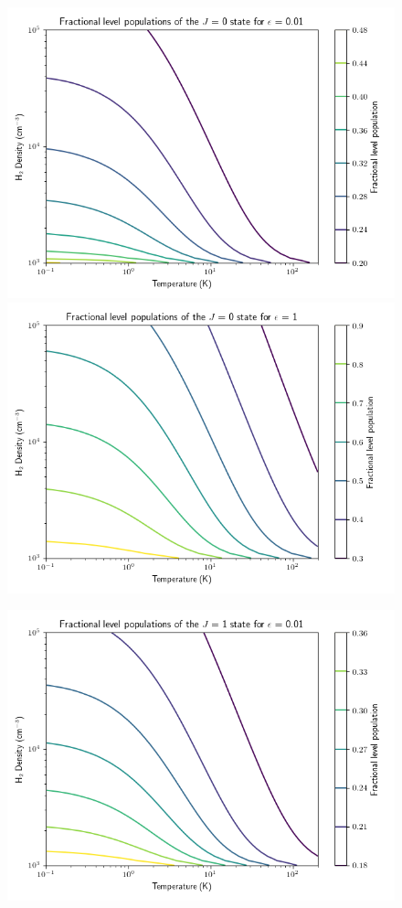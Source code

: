 \documentclass[11pt]{article}
\newenvironment{tight_enumerate}{
\begin{enumerate}[label=(\alph*)]
\setlength{\itemsep}{3pt}
\setlength{\parskip}{0pt}
}{\end{enumerate}}
\begin{document}
\begin{tight_enumerate}
\begin{figure}[H]
\includegraphics[height=0.25\textheight]{1/0_0.png}
\includegraphics[height=0.25\textheight]{1/0_1.png}
\vspace{-2.5em}
\end{figure}
\begin{figure}[H]
\centering
\includegraphics[height=0.25\textheight]{1/1_0.png}

\end{figure}
\end{tight_enumerate}
\end{document}
